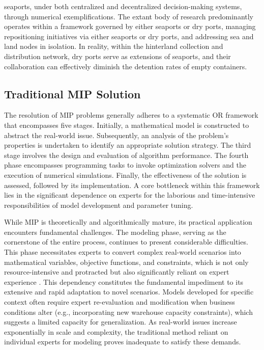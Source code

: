 \documentclass[preprint,12pt]{elsarticle}
\begin{document}
seaports, under both centralized and decentralized decision-making systems, through numerical exemplifications. The extant body of research predominantly operates within a framework governed by either seaports or dry ports, managing repositioning initiatives via either seaports or dry ports, and addressing sea and land nodes in isolation. In reality, within the hinterland collection and distribution network, dry ports serve as extensions of seaports, and their collaboration can effectively diminish the detention rates of empty containers. 

\subsection{Traditional MIP Solution}
The resolution of MIP problems generally adheres to a systematic OR framework that encompasses five stages. Initially, a mathematical model is constructed to abstract the real-world issue. Subsequently, an analysis of the problem's properties is undertaken to identify an appropriate solution strategy. The third stage involves the design and evaluation of algorithm performance. The fourth phase encompasses programming tasks to invoke optimization solvers and the execution of numerical simulations. Finally, the effectiveness of the solution is assessed, followed by its implementation. A core bottleneck within this framework lies in the significant dependence on experts for the laborious and time-intensive responsibilities of model development and parameter tuning.

While MIP is theoretically and algorithmically mature, its practical application encounters fundamental challenges. The modeling phase, serving as the cornerstone of the entire process, continues to present considerable difficulties. This phase necessitates experts to convert complex real-world scenarios into mathematical variables, objective functions, and constraints, which is not only resource-intensive and protracted but also significantly reliant on expert experience \citep{liLargeLanguageModels2023}. This dependency constitutes the fundamental impediment to its extensive and rapid adaptation to novel scenarios. Models developed for specific context often require expert re-evaluation and modification when business conditions alter (e.g., incorporating new warehouse capacity constraints), which suggests a limited capacity for generalization. As real-world issues increase exponentially in scale and complexity, the traditional method reliant on individual experts for modeling proves inadequate to satisfy these demands.
\end{document}
